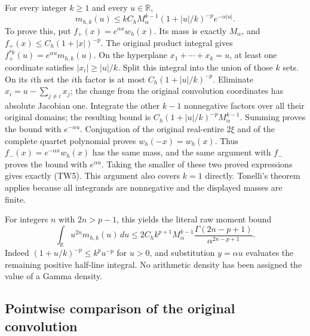 For every integer $k\geq1$ and every $u\in\mathbb{R}$,
\[
 \boxed{m_{h,k}(u)\leq
 kC_hM_\alpha^{k-1}(1+|u|/k)^{-p}e^{-\alpha|u|}.}
 \tag{TW5}
\]
To prove this, put $f_+(x)=e^{\alpha x}w_h(x)$.  Its mass is exactly
$M_\alpha$, and $f_+(x)\leq C_h(1+|x|)^{-p}$.  The original product
integral gives $f_+^{*k}(u)=e^{\alpha u}m_{h,k}(u)$.
On the hyperplane $x_1+\cdots+x_k=u$, at least one coordinate satisfies
$|x_i|\geq|u|/k$.  Split this integral into the union of those $k$ sets.
On its $i$th set the $i$th factor is at most
$C_h(1+|u|/k)^{-p}$.  Eliminate $x_i=u-\sum_{j\ne i}x_j$; the change
from the original convolution coordinates has absolute Jacobian one.
Integrate the other $k-1$ nonnegative factors over all their original
domains; the resulting bound is
$C_h(1+|u|/k)^{-p}M_\alpha^{k-1}$.
Summing proves the bound with $e^{-\alpha u}$.
Conjugation of the original real-entire $2\xi$ and of the complete
quartet polynomial proves $w_h(-x)=w_h(x)$.  Thus
$f_-(x)=e^{-\alpha x}w_h(x)$ has the same mass, and the same argument
with $f_-$ proves the bound with $e^{\alpha u}$.  Taking the smaller
of these two proved expressions gives exactly (TW5).  This argument
also covers $k=1$ directly.  Tonelli's theorem applies because all
integrands are nonnegative and the displayed masses are finite.

For integers $n$ with $2n>p-1$, this yields the literal raw moment bound
\[
 \int_{\mathbb{R}}u^{2n}m_{h,k}(u)\,du
 \leq 2C_h k^{p+1}M_\alpha^{k-1}
 \frac{\Gamma(2n-p+1)}{\alpha^{2n-p+1}}.
 \tag{TW6}
\]
Indeed $(1+u/k)^{-p}\leq k^pu^{-p}$ for $u>0$, and substitution
$y=\alpha u$ evaluates the remaining positive half-line integral.
No arithmetic density has been assigned the value of a Gamma density.

\subsection{Pointwise comparison of the original convolution}

